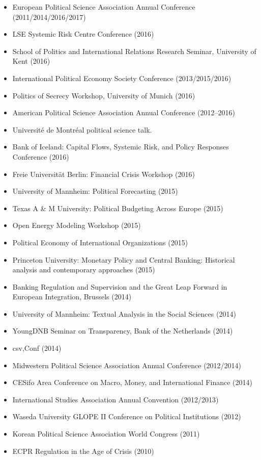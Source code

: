 \documentclass[a4paper]{article}
\begin{document}
\begin{itemize}
    \item European Political Science Association Annual Conference (2011/2014/2016/2017)
    \item LSE Systemic Risk Centre Conference (2016)
    \item School of Politics and International Relations Research Seminar, University of Kent (2016)
    \item International Political Economy Society Conference (2013/2015/2016)
    \item Politics of Secrecy Workshop, University of Munich (2016)
    \item American Political Science Association Annual Conference (2012--2016)
    \item Universit\'{e} de Montr\'{e}al political science talk.
    \item Bank of Iceland: Capital Flows, Systemic Risk, and Policy Responses Conference (2016)
    \item Freie Universit\"{a}t Berlin: Financial Crisis Workshop (2016)
    \item University of Mannheim: Political Forecasting (2015)
    \item Texas A \& M University: Political Budgeting Across Europe (2015)
    \item Open Energy Modeling Workshop (2015)
    \item Political Economy of International Organizations (2015)
    \item Princeton University: Monetary Policy and Central Banking: Historical analysis and contemporary approaches (2015)
    \item Banking Regulation and Supervision and the Great Leap Forward in European Integration, Brussels (2014)
    \item University of Mannheim: Textual Analysis in the Social Sciences (2014)
    \item YoungDNB Seminar on Transparency, Bank of the Netherlands (2014)
    \item csv,Conf (2014)
    \item Midwestern Political Science Association Annual Conference (2012/2014)
    \item CESifo Area Conference on Macro, Money, and International Finance (2014)
    \item International Studies Association Annual Convention (2012/2013)
    \item Waseda University GLOPE II Conference on Political Institutions (2012)
    \item Korean Political Science Association World Congress (2011)
    \item ECPR Regulation in the Age of Crisis (2010)
\end{itemize}
\end{document}
